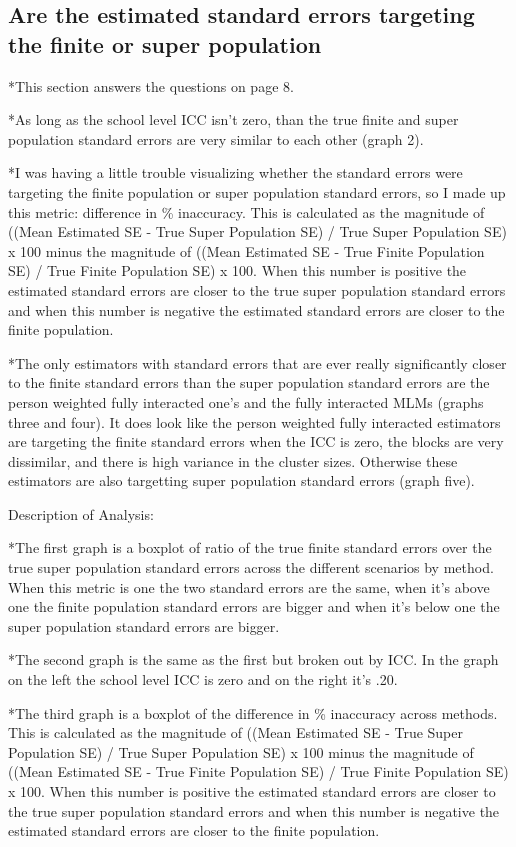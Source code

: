 \documentclass[
]{article}
\begin{document}
\subsection{Are the estimated standard errors targeting the finite or
super
population}\label{are-the-estimated-standard-errors-targeting-the-finite-or-super-population}

*This section answers the questions on page 8.

*As long as the school level ICC isn't zero, than the true finite and
super population standard errors are very similar to each other (graph
2).

*I was having a little trouble visualizing whether the standard errors
were targeting the finite population or super population standard
errors, so I made up this metric: difference in \% inaccuracy. This is
calculated as the magnitude of ((Mean Estimated SE - True Super
Population SE) / True Super Population SE) x 100 minus the magnitude of
((Mean Estimated SE - True Finite Population SE) / True Finite
Population SE) x 100. When this number is positive the estimated
standard errors are closer to the true super population standard errors
and when this number is negative the estimated standard errors are
closer to the finite population.

*The only estimators with standard errors that are ever really
significantly closer to the finite standard errors than the super
population standard errors are the person weighted fully interacted
one's and the fully interacted MLMs (graphs three and four). It does
look like the person weighted fully interacted estimators are targeting
the finite standard errors when the ICC is zero, the blocks are very
dissimilar, and there is high variance in the cluster sizes. Otherwise
these estimators are also targetting super population standard errors
(graph five).

Description of Analysis:

*The first graph is a boxplot of ratio of the true finite standard
errors over the true super population standard errors across the
different scenarios by method. When this metric is one the two standard
errors are the same, when it's above one the finite population standard
errors are bigger and when it's below one the super population standard
errors are bigger.

*The second graph is the same as the first but broken out by ICC. In the
graph on the left the school level ICC is zero and on the right it's
.20.

*The third graph is a boxplot of the difference in \% inaccuracy across
methods. This is calculated as the magnitude of ((Mean Estimated SE -
True Super Population SE) / True Super Population SE) x 100 minus the
magnitude of ((Mean Estimated SE - True Finite Population SE) / True
Finite Population SE) x 100. When this number is positive the estimated
standard errors are closer to the true super population standard errors
and when this number is negative the estimated standard errors are
closer to the finite population.
\end{document}
